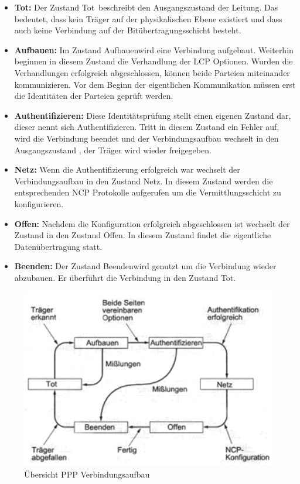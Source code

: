 \documentclass[12pt, a4paper, ngerman]{article}
\begin{document}
\begin{itemize}
\item{\textbf{Tot:}}
Der Zustand \glqq Tot\grqq ~beschreibt den Ausgangszustand der Leitung. Das bedeutet, dass kein Träger auf der physikalischen Ebene existiert und dass auch keine Verbindung auf der Bit\-über\-trag\-ungs\-schicht besteht. 

\item{\textbf{Aufbauen:}}
Im Zustand \glqq Aufbauen\grqq wird eine Verbindung aufgebaut. Weiterhin beginnen in diesem Zustand die Verhandlung der LCP Optionen. Wurden die Verhandlungen erfolgreich abgeschlossen, können beide Parteien miteinander kommunizieren. Vor dem Beginn der eigentlichen Kommunikation müssen erst die Identitäten der Parteien geprüft werden.

\item{\textbf{Authentifizieren:}}
Diese Identitätsprüfung stellt einen eigenen Zustand dar, dieser nennt sich \glqq Authentifizieren\grqq . Tritt in diesem Zustand ein Fehler auf, wird die Verbindung beendet und der Verbindungsaufbau wechselt  in den Ausgangszustand \grqq , der Träger wird wieder freigegeben.

\item{\textbf{Netz:}}
Wenn die Authentifizierung erfolgreich war wechselt der Verbindungsaufbau in den Zustand \glqq Netz\grqq . In diesem Zustand werden die entsprechenden NCP Protokolle aufgerufen um die Vermittlungsschicht zu konfigurieren.

\item{\textbf{Offen:}}
Nachdem die Konfiguration erfolgreich abgeschlossen ist wechselt der Zustand in den Zustand \glqq  Offen\grqq . In diesem Zustand findet die eigentliche Datenübertragung statt. 

\item{\textbf{Beenden:}}
Der Zustand \glqq Beenden\grqq wird genutzt um die Verbindung wieder abzubauen. Er überführt die Verbindung in den Zustand \glqq Tot\grqq .
\end{itemize}


\begin{figure}[H]
	\centering
	\includegraphics[width=1\textwidth]{Grafiken/ppp.jpg}	
	\caption{Übersicht PPP Verbindungsaufbau \cite{SWB-307875709}}
	\label{aufbau_ppp-verbindung}
\end{figure}
\end{document}
